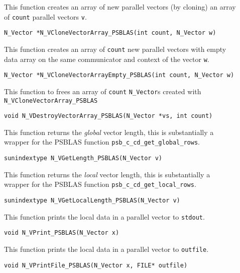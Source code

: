 \documentclass[twoside,a4paper]{refart}
\begin{document}
\begin{description}
	\item[] This function creates an array of new parallel vectors (by cloning) an array of \lstinline[style=CStyle]|count| parallel vectors \lstinline[style=CStyle]|v|.
	
	 \lstinline[style=CStyle]|N_Vector *N_VCloneVectorArray_PSBLAS(int count, N_Vector w)|
	
	\item[] This function creates an array of \lstinline[style=CStyle]|count| new parallel vectors with empty data array on the same communicator and context of the vector \lstinline[style=CStyle]|w|. 
	
	 \lstinline[style=CStyle]|N_Vector *N_VCloneVectorArrayEmpty_PSBLAS(int count, N_Vector w)|
	
	\item[] This function to frees an array of \lstinline[style=CStyle]|count| \texttt{N\_Vector}s created with \texttt{N\_VCloneVectorArray\_PSBLAS}
	
	 \lstinline[style=CStyle]|void N_VDestroyVectorArray_PSBLAS(N_Vector *vs, int count)|
	
	\item[] This function returns the \emph{global} vector length, this is substantially a wrapper for the PSBLAS function \lstinline[style=CStyle]|psb_c_cd_get_global_rows|.
	
	 \lstinline[style=CStyle]|sunindextype N_VGetLength_PSBLAS(N_Vector v)|
	
	\item[] This function returns the \emph{local} vector length, this is substantially a wrapper for the PSBLAS function \lstinline[style=CStyle]|psb_c_cd_get_local_rows|.
	
	 \lstinline[style=CStyle]|sunindextype N_VGetLocalLength_PSBLAS(N_Vector v)|
	
	\item[] This function prints the local data in a parallel vector to \lstinline[style=CStyle]|stdout|.
	
	 \lstinline[style=CStyle]|void N_VPrint_PSBLAS(N_Vector x)|
	
	\item[] This function prints the local data in a parallel vector to \lstinline[style=CStyle]|outfile|.
	
	 \lstinline[style=CStyle]|void N_VPrintFile_PSBLAS(N_Vector x, FILE* outfile)|
	
\end{description}


\printbibliography
\end{document}
